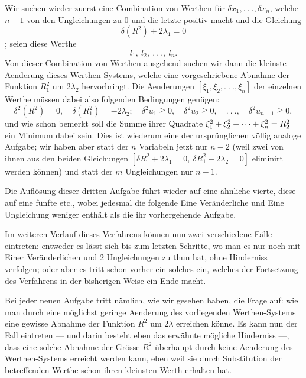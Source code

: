 \indent Wir suchen wieder zuerst eine Combination von Werthen für \(\delta x_1,.\ .\ .,\delta x_n\), welche \(n-1\) von den Ungleichungen zu 0 und die letzte positiv macht und die Gleichung
\[
\delta(R^2)+2\lambda_1=0
\]
\noindent [befriedigt]; seien diese Werthe
\[
l_1,\ l_2,\ .\ .\ .,\ l_n.
\]
\noindent Von dieser Combination von Werthen ausgehend suchen wir dann die kleinste Aenderung dieses Werthen-Systems, welche eine vorgeschriebene Abnahme der Funktion \(R_1^2\) um \(2\lambda_2\) hervorbringt. Die Aenderungen \([\xi_1,\xi_2,.\ .\ .,\xi_n]\) der einzelnen Werthe müssen dabei also folgenden Bedingungen genügen:
\[
\delta^2(R^2)=0,\quad\delta(R_1^2)=-2\lambda_2;\quad\delta^2u_1\geqq0,\quad\delta^2u_2\geqq0,\quad .\ .\ .,\quad\delta^2u_{n-1}\geqq0,
\]
\clearpage{}
\noindent und wie schon bemerkt soll die Summe ihrer Quadrate \(\xi_1^2+\xi_2^2+\mathinner{\cdotp\cdotp\cdotp}+\xi_n^2=R_2^2\) ein Minimum dabei sein. Dies ist wiederum eine der ursprünglichen völlig analoge Aufgabe; wir haben aber statt der \(n\) Variabeln jetzt nur \(n-2\) (weil zwei von ihnen aus den beiden Gleichungen \([\delta R^2+2\lambda_1=0,\ \delta R_1^2+2\lambda_2=0]\) eliminirt werden können) und statt der \(m\) Ungleichungen nur \(n-1\).

\indent Die Auflösung dieser dritten Aufgabe führt wieder auf eine ähnliche vierte, diese auf eine fünfte etc., wobei jedesmal die folgende Eine Veränderliche und Eine Ungleichung weniger enthält als die ihr vorhergehende Aufgabe.

\indent Im weiteren Verlauf dieses Verfahrens können nun zwei verschiedene Fälle eintreten: entweder es lässt sich bis zum letzten Schritte, wo man es nur noch mit Einer Veränderlichen und 2 Ungleichungen zu thun hat, ohne Hinderniss verfolgen; oder aber es tritt schon vorher ein solches ein, welches der Fortsetzung des Verfahrens in der bisherigen Weise ein Ende macht.

\indent Bei jeder neuen Aufgabe tritt nämlich, wie wir gesehen haben, die Frage auf: wie man durch eine möglichst geringe Aenderung des vorliegenden Werthen-Systems eine gewisse Abnahme der Funktion \(R^2\) um \(2\lambda\) erreichen könne. Es kann nun der Fall eintreten — und darin besteht eben das erwähnte mögliche Hinderniss —, dass eine solche Abnahme der Grösse \(R^2\) überhaupt durch keine Aenderung des Werthen-Systems erreicht werden kann, eben weil sie durch Substitution der betreffenden Werthe schon ihren kleinsten Werth erhalten hat.

